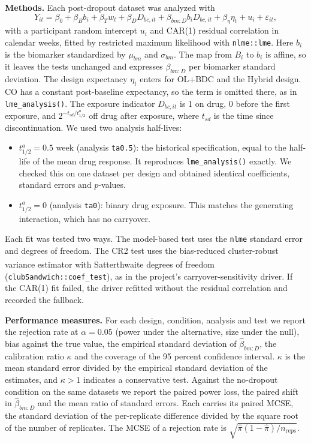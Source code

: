\documentclass[
  11pt,
]{article}
\providecommand{\tightlist}{%
  \setlength{\itemsep}{0pt}\setlength{\parskip}{0pt}}
\begin{document}
\textbf{Methods.} Each post-dropout dataset was analyzed with
\[Y_{it} = \beta_0 + \beta_B b_i + \beta_T w_t + \beta_D D_{bc,it} +
\beta_{bm:D} b_i D_{bc,it} + \beta_\eta \eta_t + u_i +
\varepsilon_{it},\]
with a participant random intercept \(u_i\) and CAR(1) residual
correlation in calendar weeks, fitted by restricted maximum likelihood
with \texttt{nlme::lme}. Here \(b_i\) is the biomarker standardized by
\(\mu_{bm}\) and \(\sigma_{bm}\). The map from \(B_i\) to \(b_i\) is affine,
so it leaves the tests unchanged and expresses \(\beta_{bm:D}\) per
biomarker standard deviation. The design expectancy \(\eta_t\) enters for OL+BDC and
the Hybrid design. CO has a constant post-baseline expectancy, so the
term is omitted there, as in \texttt{lme\_analysis()}. The exposure indicator
\(D_{bc,it}\) is 1 on drug, 0 before the first exposure, and
\(2^{-t_{sd}/t^a_{1/2}}\) off drug after exposure, where \(t_{sd}\) is the
time since discontinuation. We used two analysis half-lives:

\begin{itemize}
\tightlist
\item
  \(t^a_{1/2} = 0.5\) week (analysis \texttt{ta0.5}): the historical
  specification, equal to the half-life of the mean drug response. It
  reproduces \texttt{lme\_analysis()} exactly. We checked this on one dataset
  per design and obtained identical coefficients, standard errors and
  \(p\)-values.
\item
  \(t^a_{1/2} = 0\) (analysis \texttt{ta0}): binary drug exposure. This matches
  the generating interaction, which has no carryover.
\end{itemize}

Each fit was tested two ways. The model-based test uses the \texttt{nlme}
standard error and degrees of freedom. The CR2 test uses the
bias-reduced cluster-robust variance estimator\textsuperscript{} with
Satterthwaite degrees of freedom (\texttt{clubSandwich::coef\_test}), as in
the project's carryover-sensitivity driver. If the CAR(1) fit failed,
the driver refitted without the residual correlation and recorded the
fallback.

\textbf{Performance measures.} For each design, condition, analysis and
test we report the rejection rate at \(\alpha = 0.05\) (power under the
alternative, size under the null), bias against the true value, the
empirical standard deviation of \(\hat\beta_{bm:D}\), the calibration
ratio \(\kappa\) and the coverage of the 95 percent confidence interval.
\(\kappa\) is the mean standard error divided by the empirical standard
deviation of the estimates, and \(\kappa > 1\) indicates a conservative
test. Against the no-dropout condition on the same datasets we report
the paired power loss, the paired shift in \(\hat\beta_{bm:D}\) and the
mean ratio of standard errors. Each carries its paired MCSE, the
standard deviation of the per-replicate difference divided by the
square root of the number of replicates. The MCSE of a rejection rate
is \(\sqrt{\hat\pi(1-\hat\pi)/n_{\text{reps}}}\).
\end{document}
